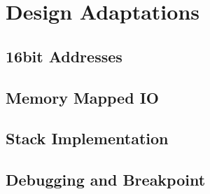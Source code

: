 \chapter{Design Adaptations}\label{cha:designChanges}
\section{16bit Addresses}
\section{Memory Mapped IO}
\section{Stack Implementation}
\section{Debugging and Breakpoint}